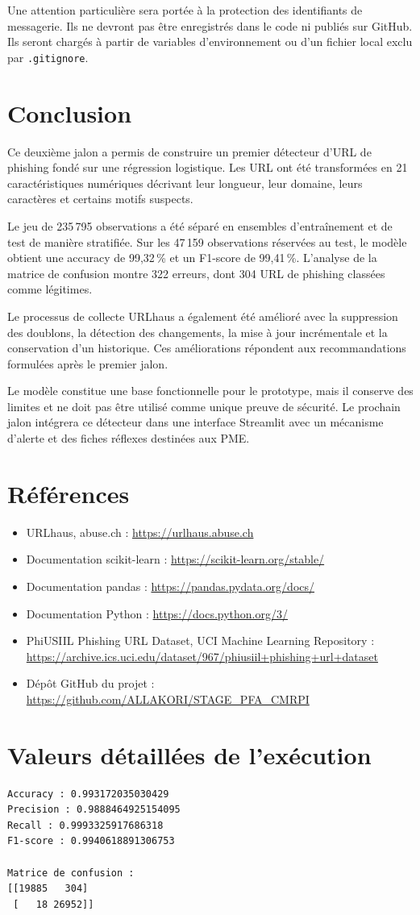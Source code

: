 \documentclass[11pt,a4paper]{report}
\begin{document}
Une attention particulière sera portée à la protection des identifiants de
messagerie. Ils ne devront pas être enregistrés dans le code ni publiés sur
GitHub. Ils seront chargés à partir de variables d'environnement ou d'un
fichier local exclu par \texttt{.gitignore}.

\chapter{Conclusion}

Ce deuxième jalon a permis de construire un premier détecteur d'URL de
phishing fondé sur une régression logistique. Les URL ont été transformées en
21 caractéristiques numériques décrivant leur longueur, leur domaine, leurs
caractères et certains motifs suspects.

Le jeu de 235\,795 observations a été séparé en ensembles d'entraînement et
de test de manière stratifiée. Sur les 47\,159 observations réservées au test,
le modèle obtient une accuracy de 99,32\,\% et un F1-score de 99,41\,\%.
L'analyse de la matrice de confusion montre 322 erreurs, dont 304 URL de
phishing classées comme légitimes.

Le processus de collecte URLhaus a également été amélioré avec la suppression
des doublons, la détection des changements, la mise à jour incrémentale et la
conservation d'un historique. Ces améliorations répondent aux recommandations
formulées après le premier jalon.

Le modèle constitue une base fonctionnelle pour le prototype, mais il conserve
des limites et ne doit pas être utilisé comme unique preuve de sécurité. Le
prochain jalon intégrera ce détecteur dans une interface Streamlit avec un
mécanisme d'alerte et des fiches réflexes destinées aux PME.

\chapter*{Références}

\begin{itemize}
  \item URLhaus, abuse.ch : \url{https://urlhaus.abuse.ch}
  \item Documentation scikit-learn :
        \url{https://scikit-learn.org/stable/}
  \item Documentation pandas : \url{https://pandas.pydata.org/docs/}
  \item Documentation Python : \url{https://docs.python.org/3/}
  \item PhiUSIIL Phishing URL Dataset, UCI Machine Learning Repository :
        \url{https://archive.ics.uci.edu/dataset/967/phiusiil+phishing+url+dataset}
  \item Dépôt GitHub du projet :
        \url{https://github.com/ALLAKORI/STAGE_PFA_CMRPI}
\end{itemize}

\appendix
\chapter{Valeurs détaillées de l'exécution}

\begin{verbatim}
Accuracy : 0.993172035030429
Precision : 0.9888464925154095
Recall : 0.9993325917686318
F1-score : 0.9940618891306753

Matrice de confusion :
[[19885   304]
 [   18 26952]]
\end{verbatim}
\end{document}
